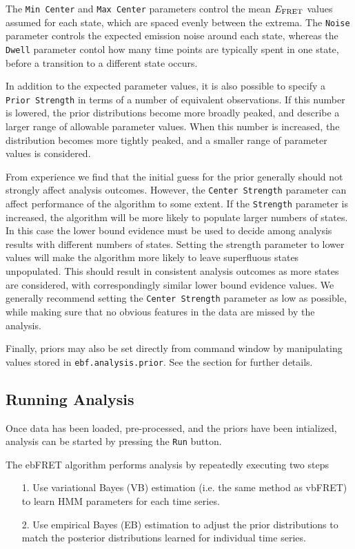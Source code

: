 \documentclass[12pt,article,oldfontcommands]{memoir}
\begin{document}
The \texttt{Min Center} and \texttt{Max Center} parameters control the mean $E_{\rm FRET}$ values assumed for each state, which are spaced evenly between the extrema. The \texttt{Noise} parameter controls the expected emission noise around each state, whereas the \texttt{Dwell} parameter contol how many time points are typically spent in one state, before a transition to a different state occurs.

In addition to the expected parameter values, it is also possible to specify a \texttt{Prior Strength} in terms of a number of equivalent observations. If this number is lowered, the prior distributions become more broadly peaked, and describe a larger range of allowable parameter values. When this number is increased, the distribution becomes more tightly peaked, and a smaller range of parameter values is considered.

From experience we find that the initial guess for the prior generally should not strongly affect analysis outcomes. However, the \texttt{Center Strength} parameter can affect performance of the algorithm to some extent. If the \texttt{Strength} parameter is increased, the algorithm will be more likely to populate larger numbers of states. In this case the lower bound evidence must be used to decide among analysis results with different numbers of states. Setting the strength parameter to lower values will make the algorithm more likely to leave superfluous states unpopulated. This should result in consistent analysis outcomes as more states are considered, with correspondingly similar lower bound evidence values. We generally recommend setting the \texttt{Center Strength} parameter as low as possible, while making sure that no obvious features in the data are missed by the analysis.

Finally, priors may also be set directly from command window by manipulating values stored in \texttt{ebf.analysis.prior}. See the \emph{} section for further details.

\subsection{Running Analysis}

Once data has been loaded, pre-processed, and the priors have been intialized, analysis can be started by pressing the \texttt{Run} button.

The ebFRET algorithm performs analysis by repeatedly executing two steps

\begin{itemize}
\item[1.] Use variational Bayes (VB) estimation (i.e. the same method as vbFRET) to learn HMM parameters for each time series.
\item[2.] Use empirical Bayes (EB) estimation to adjust the prior distributions to match the posterior distributions learned for individual time series.
\end{itemize}
\end{document}
